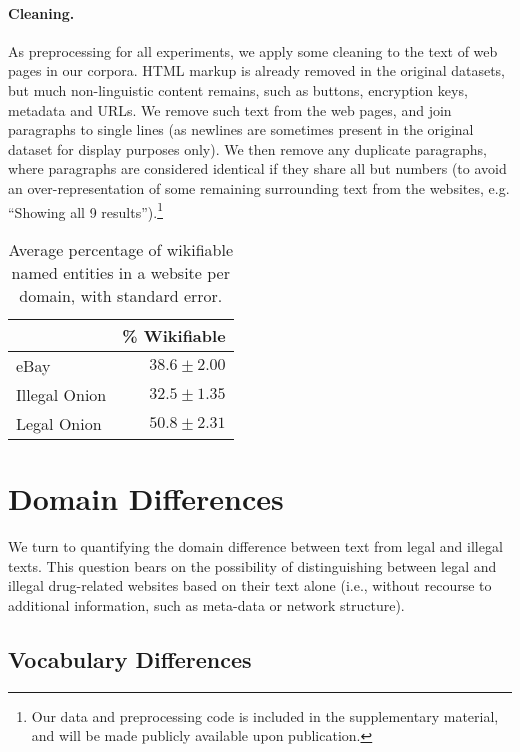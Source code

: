 \documentclass[11pt,a4paper,table]{article}
\begin{document}
\paragraph{Cleaning.} 
As preprocessing for all experiments, we apply some cleaning to the text
of web pages in our corpora.
HTML markup is already removed in the original datasets,
but much non-linguistic content remains, such as
buttons, encryption keys, metadata and URLs.
We remove such text from the web pages, and join paragraphs 
to single lines (as newlines are sometimes present in the original dataset for display purposes only).
We then remove any duplicate paragraphs, where paragraphs are considered
identical if they share all but numbers (to avoid an over-representation of some remaining surrounding text from the websites, e.g. ``Showing all 9 results'').\footnote{Our data and preprocessing code is included in the supplementary material, and will be made publicly available upon publication.}

\begin{table}
\begin{center}
\begin{tabular}{l|r}
 & \% Wikifiable\\
 \hline
eBay & $38.6 \pm2.00$\\
Illegal Onion & $32.5 \pm1.35$\\
Legal Onion & $50.8 \pm2.31$
\end{tabular}
\end{center}
\caption{Average percentage of wikifiable named entities in a website per domain, with standard error.\label{ta:wiki}}
\end{table}

\section{Domain Differences}\label{sec:domain}
    
    We turn to quantifying the domain difference between text from legal and illegal texts. This question bears on the possibility of distinguishing between legal and illegal drug-related websites based on their text alone (i.e., without recourse to additional information, such as meta-data or network structure).

\subsection{Vocabulary Differences}
\end{document}
